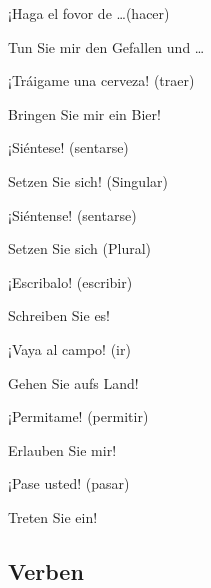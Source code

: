 \begin{compactitem}
    \item  ¡Haga el fovor de \ldots (hacer)
        \begin{compactitem}\itshape \item Tun Sie mir den Gefallen und \ldots \end{compactitem}
    \item  ¡Tráigame una cerveza! (traer)
        \begin{compactitem}\itshape \item Bringen Sie mir ein Bier!\end{compactitem}
    \item  ¡Siéntese! (sentarse)
        \begin{compactitem}\itshape \item Setzen Sie sich! (Singular)\end{compactitem}
    \item  ¡Siéntense! (sentarse)
        \begin{compactitem}\itshape \item Setzen Sie sich (Plural)\end{compactitem}
    \item  ¡Escribalo! (escribir)
        \begin{compactitem}\itshape \item Schreiben Sie es!\end{compactitem}
    \item  ¡Vaya al campo! (ir)
        \begin{compactitem}\itshape \item Gehen Sie aufs Land!\end{compactitem}
    \item  ¡Permitame! (permitir)
        \begin{compactitem}\itshape \item Erlauben Sie mir!\end{compactitem}
    \item  ¡Pase usted! (pasar)
        \begin{compactitem}\itshape \item Treten Sie ein!\end{compactitem}
\end{compactitem}


\subsection*{Verben}

